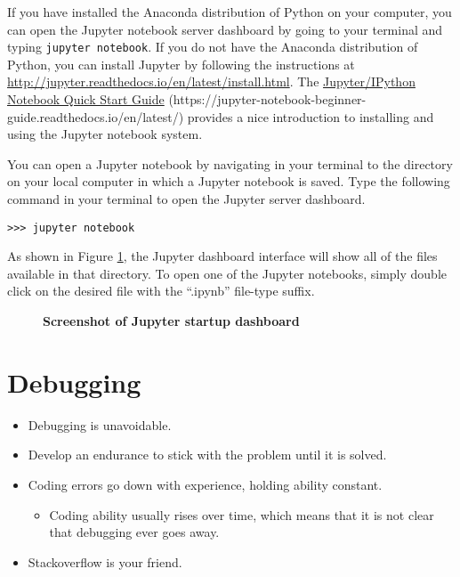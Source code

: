     If you have installed the Anaconda distribution of Python on your computer, you can open the Jupyter notebook server dashboard by going to your terminal and typing \texttt{jupyter notebook}. If you do not have the Anaconda distribution of Python, you can install Jupyter by following the instructions at \href{http://jupyter.readthedocs.io/en/latest/install.html}{http://jupyter.readthedocs.io/en/latest/install.html}. The \href{https://jupyter-notebook-beginner-guide.readthedocs.io/en/latest/}{Jupyter/IPython Notebook Quick Start Guide} (https://jupyter-notebook-beginner-guide.readthedocs.io/en/latest/) provides a nice introduction to installing and using the Jupyter notebook system.

    You can open a Jupyter notebook by navigating in your terminal to the directory on your local computer in which a Jupyter notebook is saved. Type the following command in your terminal to open the Jupyter server dashboard.
    \begin{lstlisting}[frame=single]
      >>> jupyter notebook
    \end{lstlisting}
    As shown in Figure \ref{FigPythonJupInit}, the Jupyter dashboard interface will show all of the files available in that directory. To open one of the Jupyter notebooks, simply double click on the desired file with the ``.ipynb'' file-type suffix.

    \begin{figure}[htbp]\centering\captionsetup{width=6.0in}
      \caption{\textbf{Screenshot of Jupyter startup dashboard}}\label{FigPythonJupInit}
    \end{figure}


\section{Debugging}\label{SecPythonDebug}

  \begin{itemize}
    \item Debugging is unavoidable.
    \item Develop an endurance to stick with the problem until it is solved.
    \item Coding errors go down with experience, holding ability constant.
      \begin{itemize}
        \item Coding ability usually rises over time, which means that it is not clear that debugging ever goes away.
      \end{itemize}
    \item Stackoverflow is your friend.
  \end{itemize}


